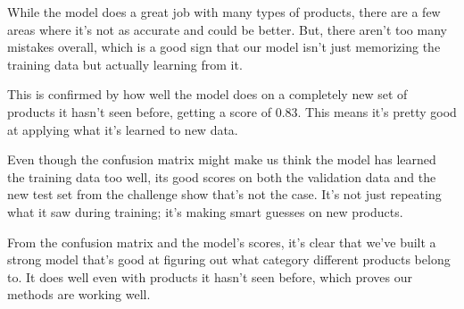 While the model does a great job with many types of products, there are a few areas where it's not as accurate and could be better. But, there aren't too many mistakes overall, which is a good sign that our model isn't just memorizing the training data but actually learning from it.

This is confirmed by how well the model does on a completely new set of products it hasn't seen before, getting a score of 0.83. This means it's pretty good at applying what it's learned to new data.

Even though the confusion matrix might make us think the model has learned the training data too well, its good scores on both the validation data and the new test set from the challenge show that's not the case. It's not just repeating what it saw during training; it's making smart guesses on new products.

From the confusion matrix and the model's scores, it's clear that we've built a strong model that's good at figuring out what category different products belong to. It does well even with products it hasn't seen before, which proves our methods are working well.